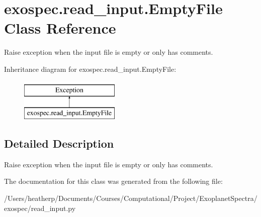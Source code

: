 \hypertarget{classexospec_1_1read__input_1_1_empty_file}{}\section{exospec.\+read\+\_\+input.\+Empty\+File Class Reference}
\label{classexospec_1_1read__input_1_1_empty_file}


Raise exception when the input file is empty or only has comments.  


Inheritance diagram for exospec.\+read\+\_\+input.\+Empty\+File\+:\begin{figure}[H]
\begin{center}
\leavevmode
\includegraphics[height=2.000000cm]{classexospec_1_1read__input_1_1_empty_file}
\end{center}
\end{figure}


\subsection{Detailed Description}
Raise exception when the input file is empty or only has comments. 

The documentation for this class was generated from the following file\+:\begin{DoxyCompactItemize}
\item 
/\+Users/heatherp/\+Documents/\+Courses/\+Computational/\+Project/\+Exoplanet\+Spectra/exospec/read\+\_\+input.\+py\end{DoxyCompactItemize}
